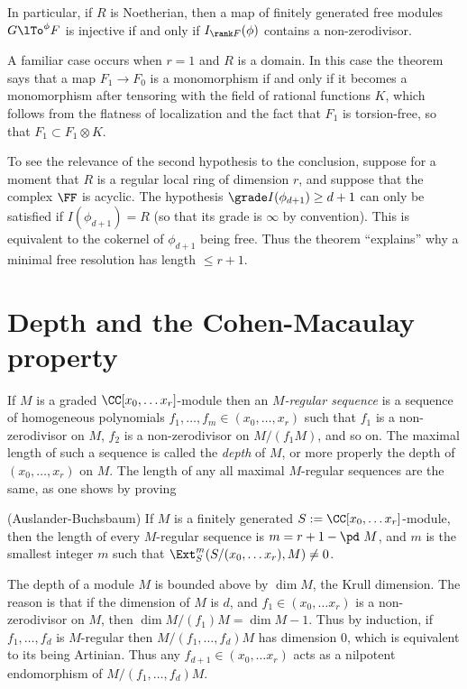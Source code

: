 In particular, if $R$ is Noetherian, then a map of finitely generated free modules  $G\lTo^{\phi}F$ is injective 
if and only if $I_{\rank F}(\phi)$ contains a non-zerodivisor.

A familiar case occurs when  $r=1$ and $R$ is a domain. In this case the theorem says that a map $F_1\to F_0$ is a monomorphism if and only if it becomes a monomorphism after tensoring with the field of rational functions $K$, which follows from the flatness of
localization and the fact that $F_1$ is torsion-free, so that
$F_1 \subset F_1 \otimes K$. 

To see the relevance of the second hypothesis to the conclusion, suppose for a moment that $R$ is
a regular local ring of dimension $r$, and suppose that the complex $\FF$ is acyclic. The hypothesis $\grade I(\phi_{d+1}) \geq d+1$ can only be satisfied if $I(\phi_{d+1}) = R$ (so that its grade is $\infty$ by convention). This  is equivalent to the cokernel of $\phi_{d+1}$ being free. Thus the theorem ``explains'' why a minimal free resolution
has length $\leq r+1$.

\section{Depth and the Cohen-Macaulay property}

If $M$ is a graded  $\CC[x_0, \dots x_r]$-module then an \emph{$M$-regular sequence} is a sequence of homogeneous polynomials
$f_1,\dots,f_m \in (x_0,\dots, x_r)$ such that $f_1$ is a non-zerodivisor on $M$, $f_2$ is a non-zerodivisor on $M/(f_1M)$, and so on. 
The maximal length of such a sequence is called the \emph{depth} of $M$, or more properly the depth of $(x_0,\dots, x_r)$ on $M$.
The length of any all maximal $M$-regular sequences are the same, as one shows by proving

\begin{theorem} (Auslander-Buchsbaum)\label{Auslander-Buchsbaum}
If $M$ is a finitely generated $S := \CC[x_0, \dots x_r]$-module, then the length of every $M$-regular sequence is $m = r+1 - \pd\  M$,
and $m$ is the smallest integer $m$ such that $\Ext_S^m(S/(x_0, \dots x_r), M) \neq 0$.
\end{theorem}
 
 The depth of a module $M$ is bounded above by $\dim M$, the Krull dimension. The reason is that if the dimension of $M$
 is $d$, and $f_1 \in (x_0, \dots x_r) $ is a non-zerodivisor on $M$, then $\dim M/(f_1)M= \dim M-1$. Thus by induction, if
  $f_1,\dots, f_d$ is $M$-regular then $M/(f_1, \dots, f_d)M$ has dimension 0, which is equivalent to its being Artinian. Thus any 
$ f_{d+1} \in(x_0, \dots x_r) $ acts as a nilpotent endomorphism of $M/(f_1, \dots, f_d)M$.

